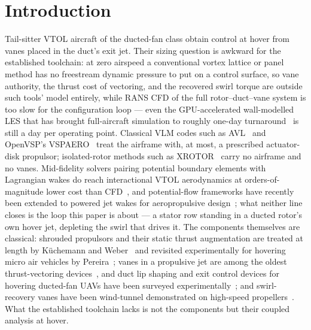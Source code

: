 \documentclass[]{aiaa-tc}%
\begin{document}
\section{Introduction}


Tail-sitter VTOL aircraft of the ducted-fan class obtain control at
hover from vanes placed in the duct's exit jet. Their sizing question
is awkward for the established toolchain: at zero airspeed a
conventional vortex lattice or panel method has no freestream dynamic
pressure to put on a control surface, so vane authority, the thrust
cost of vectoring, and the recovered swirl torque are outside such
tools' model entirely, while RANS CFD of the full rotor--duct--vane
system is too slow for the configuration loop --- even the
GPU-accelerated wall-modelled LES that has brought full-aircraft
simulation to roughly one-day turnaround~\cite{goc2021} is still a
day per operating point. Classical VLM codes
such as AVL~\cite{avl} and OpenVSP's VSPAERO~\cite{openvsp2022} treat
the airframe with, at most, a prescribed
actuator-disk propulsor; isolated-rotor methods such as
XROTOR~\cite{xrotor} carry no airframe and no vanes. Mid-fidelity
solvers pairing potential boundary elements with Lagrangian wakes do
reach interactional VTOL aerodynamics at orders-of-magnitude lower
cost than CFD~\cite{tugnoli2021}, and potential-flow frameworks have
recently been extended to powered jet wakes for aeropropulsive
design~\cite{jois2026}; what neither line closes is the loop this
paper is about --- a stator row standing in a ducted rotor's own
hover jet, depleting the swirl that drives it. The components
themselves are classical: shrouded propulsors and their static thrust
augmentation are treated at length by K\"uchemann and
Weber~\cite{kuchemannWeber1953} and revisited experimentally for
hovering micro air vehicles by Pereira~\cite{pereira2008}; vanes in a
propulsive jet are among the oldest thrust-vectoring
devices~\cite{sutton2016}, and duct lip shaping and exit control
devices for hovering ducted-fan UAVs have been surveyed
experimentally~\cite{graf2005}; and swirl-recovery vanes have been
wind-tunnel demonstrated on high-speed
propellers~\cite{gazzaniga1992}. What the established toolchain lacks
is not the components but their coupled analysis at hover.
\end{document}
